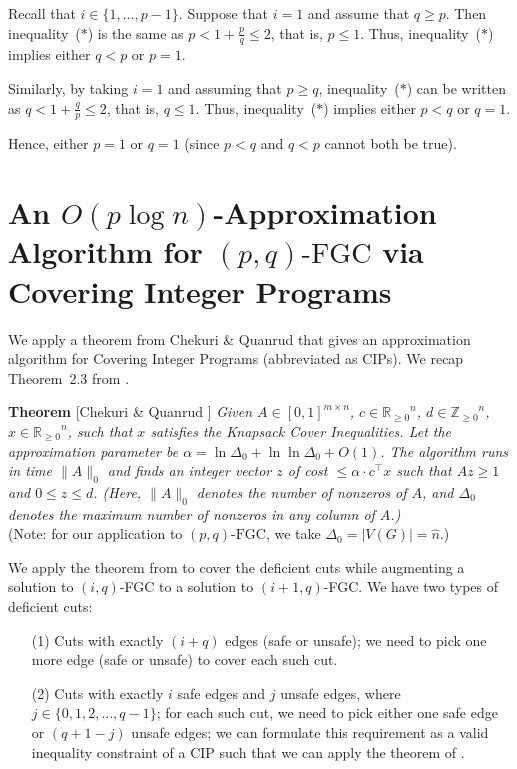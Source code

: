 \documentclass[11pt]{article}
\newcommand{\R}{\ensuremath{\mathbb R}}
\newcommand{\Rp}{\ensuremath{\R_{\geq 0}}}
\newcommand{\Zint}{\ensuremath{\mathbb Z}}
\newcommand{\Zp}{\ensuremath{\Zint_{\geq 0}}}
\newcommand{\fgc}{\mathrm{FGC}}
\newcommand{\pqfgc}{(p,q)\text{-}\fgc}
\begin{document}
\begin{appendices}
{Recall that $i \in \{1,...,p-1\}$.
Suppose that $i=1$ and assume that $q\geq p$.
Then inequality~($*$) is the same as
$\displaystyle p < 1 + \frac{p}{q} \leq 2$, that is, $p \leq 1$.
Thus, inequality~($*$) implies either $q < p$ or $p = 1$.

Similarly, by taking $i=1$ and assuming that $p\geq q$, inequality~($*$) can be written as
$\displaystyle q < 1 + \frac{q}{p} \leq 2$, that is, $q \leq 1$.
Thus, inequality~($*$) implies either $p < q$ or $q = 1$.

Hence, either $p=1$ or $q=1$ (since $p < q$ and $q < p$ cannot both be true).
}
\section{An $O(p\log{n})$-Approximation Algorithm for $\pqfgc$ via Covering Integer Programs \label{sec:A2:log-approx}}
{
We apply a theorem from Chekuri \& Quanrud \cite{CQ:soda19} that gives
an approximation algorithm for Covering Integer Programs (abbreviated as CIPs).
We recap Theorem~2.3 from \cite{CQ:soda19}.

\medskip

\noindent
\textbf{Theorem} [Chekuri \& Quanrud \cite{CQ:soda19}]
\textit{Given $A\in[0,1]^{m\times{n}}$, $c\in\Rp^n$, $d\in\Zp^n$, $x\in\Rp^n$,
such that $x$ satisfies the Knapsack Cover Inequalities.
Let the approximation parameter be $\alpha = \ln\Delta_0+\ln\ln\Delta_0+O(1)$.
The algorithm runs in time $\|A\|_0$ and finds an integer vector $z$
of cost $\leq \alpha \cdot c^\top x$ such that $Az\geq 1$ and $0\leq z\leq d$.
(Here, $\|A\|_0$ denotes the number of nonzeros of $A$, and $\Delta_0$
denotes the maximum number of nonzeros in any column of $A$.)
}
\\
(Note: for our application to $\pqfgc$, we take $\Delta_0 = |V(G)| = \hat{n}$.)

\bigskip

We apply the theorem from \cite{CQ:soda19} to cover the deficient cuts
while augmenting a solution to $(i,q)$-FGC to a solution to $(i+1,q)$-FGC.
We have two types of deficient cuts:

\begin{itemize}
\item[(1)]
Cuts with exactly $(i+q)$ edges (safe or unsafe);
we need to pick one more edge (safe or unsafe) to cover each such cut.

\item[(2)]
Cuts with exactly $i$ safe edges and $j$ unsafe edges, where $j\in\{0,1,2,\dots,q-1\}$;
for each such cut, we need to pick either one safe edge or $(q+1-j)$ unsafe edges;
we can formulate this requirement as a valid inequality constraint of a CIP
such that we can apply the theorem of \cite{CQ:soda19}.


\end{itemize}}
\end{appendices}
\end{document}
